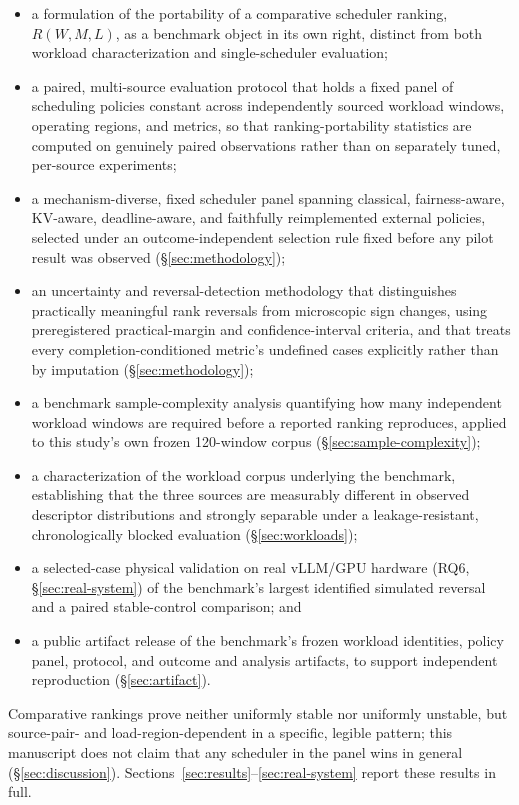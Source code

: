\begin{itemize}
  \item a formulation of the portability of a comparative scheduler
    ranking, $R(W, M, L)$, as a benchmark object in its own right, distinct
    from both workload characterization and single-scheduler evaluation;
  \item a paired, multi-source evaluation protocol that holds a fixed
    panel of scheduling policies constant across independently sourced
    workload windows, operating regions, and metrics, so that
    ranking-portability statistics are computed on genuinely paired
    observations rather than on separately tuned, per-source experiments;
  \item a mechanism-diverse, fixed scheduler panel spanning classical,
    fairness-aware, KV-aware, deadline-aware, and faithfully reimplemented
    external policies, selected under an outcome-independent selection
    rule fixed before any pilot result was observed
    (\S\ref{sec:methodology});
  \item an uncertainty and reversal-detection methodology that
    distinguishes practically meaningful rank reversals from microscopic
    sign changes, using preregistered practical-margin and
    confidence-interval criteria, and that treats every
    completion-conditioned metric's undefined cases explicitly rather than
    by imputation (\S\ref{sec:methodology});
  \item a benchmark sample-complexity analysis quantifying how many
    independent workload windows are required before a reported ranking
    reproduces, applied to this study's own frozen 120-window corpus
    (\S\ref{sec:sample-complexity});
  \item a characterization of the workload corpus underlying the
    benchmark, establishing that the three sources are measurably
    different in observed descriptor distributions and strongly separable
    under a leakage-resistant, chronologically blocked evaluation
    (\S\ref{sec:workloads});
  \item a selected-case physical validation on real vLLM/GPU hardware
    (RQ6, \S\ref{sec:real-system}) of the benchmark's largest identified
    simulated reversal and a paired stable-control comparison; and
  \item a public artifact release of the benchmark's frozen workload
    identities, policy panel, protocol, and outcome and analysis
    artifacts, to support independent reproduction (\S\ref{sec:artifact}).
\end{itemize}

Comparative rankings prove neither uniformly stable nor uniformly
unstable, but source-pair- and load-region-dependent in a specific,
legible pattern; this manuscript does not claim that any scheduler in the
panel wins in general (\S\ref{sec:discussion}). Sections~\ref{sec:results}--\ref{sec:real-system}
report these results in full.
